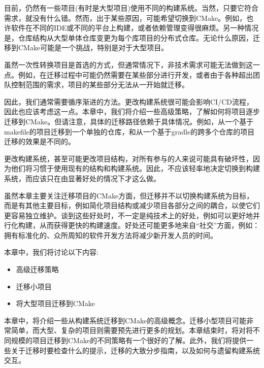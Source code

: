 目前，仍然有一些项目(有时是大型项目)使用不同的构建系统。当然，只要它符合需求，就没有什么错。然而，出于某些原因，可能希望切换到CMake。例如，也许软件在不同的IDE或不同的平台上构建，或者依赖管理变得很麻烦。另一种情况是，仓库结构从大型单体仓库变更为每个库项目的分布式仓库。无论什么原因，迁移到CMake可能是一个挑战，特别是对于大型项目。

虽然一次性转换项目是首选的方式，但通常情况下，非技术需求可能无法做到这一点。例如，在迁移过程中可能仍然需要在某些部分进行开发，或者由于各种超出团队控制范围的需求，项目的某些部分无法从一开始就迁移。

因此，我们通常需要循序渐进的方法。更改构建系统很可能会影响CI/CD流程，因此也应该考虑这一点。本章中，我们将介绍一些高级策略，了解如何将项目逐步迁移到CMake。但请注意，具体的迁移路径依赖于具体情况。例如，从一个基于makefile的项目迁移到一个单独的仓库，和从一个基于gradle的跨多个仓库的项目迁移的效果是不同的。

更改构建系统，甚至可能更改项目结构，对所有参与的人来说可能具有破坏性，因为他们将习惯于使用现有的结构和构建系统。因此，不应该轻率地决定切换到构建系统，而应该只在由显著好处的情况下才这么做。

虽然本章主要关注迁移项目的CMake方面，但迁移并不以切换构建系统为目标，而是有其他主要目标，例如简化项目结构或减少项目各部分之间的耦合，以使它们更容易独立维护。谈到这些好处时，不一定是纯技术上的好处，例如可以更好地并行化构建，从而获得更快的构建速度。好处还可能更多地来自“社交”方面，例如：拥有标准化的、众所周知的软件开发方法将减少新开发人员的时间。

本章中，我们将讨论以下内容:

\begin{itemize}
\item 
高级迁移策略

\item 
迁移小项目

\item 
将大型项目迁移到CMake
\end{itemize}

本章中，将介绍一些从构建系统迁移到CMake的高级概念。迁移小型项目可能非常简单，而大型、复杂的项目则需要预先进行更多的规划。本章结束时，将对将不同规模的项目迁移到CMake的不同策略有一个很好的了解。此外，我们将提供一些关于迁移时要检查什么的提示，迁移的大致分步指南，以及如何与遗留构建系统交互。